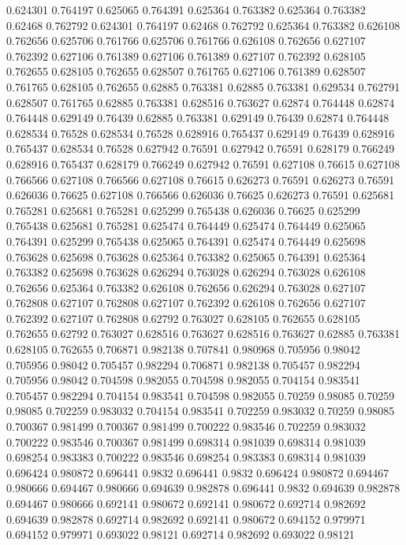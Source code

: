 0.624301 0.764197
0.625065 0.764391
0.625364 0.763382
0.625364 0.763382
0.62468 0.762792
0.624301 0.764197
0.62468 0.762792
0.625364 0.763382
0.626108 0.762656
0.625706 0.761766
0.625706 0.761766
0.626108 0.762656
0.627107 0.762392
0.627106 0.761389
0.627106 0.761389
0.627107 0.762392
0.628105 0.762655
0.628105 0.762655
0.628507 0.761765
0.627106 0.761389
0.628507 0.761765
0.628105 0.762655
0.62885 0.763381
0.62885 0.763381
0.629534 0.762791
0.628507 0.761765
0.62885 0.763381
0.628516 0.763627
0.62874 0.764448
0.62874 0.764448
0.629149 0.76439
0.62885 0.763381
0.629149 0.76439
0.62874 0.764448
0.628534 0.76528
0.628534 0.76528
0.628916 0.765437
0.629149 0.76439
0.628916 0.765437
0.628534 0.76528
0.627942 0.76591
0.627942 0.76591
0.628179 0.766249
0.628916 0.765437
0.628179 0.766249
0.627942 0.76591
0.627108 0.76615
0.627108 0.766566
0.627108 0.766566
0.627108 0.76615
0.626273 0.76591
0.626273 0.76591
0.626036 0.76625
0.627108 0.766566
0.626036 0.76625
0.626273 0.76591
0.625681 0.765281
0.625681 0.765281
0.625299 0.765438
0.626036 0.76625
0.625299 0.765438
0.625681 0.765281
0.625474 0.764449
0.625474 0.764449
0.625065 0.764391
0.625299 0.765438
0.625065 0.764391
0.625474 0.764449
0.625698 0.763628
0.625698 0.763628
0.625364 0.763382
0.625065 0.764391
0.625364 0.763382
0.625698 0.763628
0.626294 0.763028
0.626294 0.763028
0.626108 0.762656
0.625364 0.763382
0.626108 0.762656
0.626294 0.763028
0.627107 0.762808
0.627107 0.762808
0.627107 0.762392
0.626108 0.762656
0.627107 0.762392
0.627107 0.762808
0.62792 0.763027
0.628105 0.762655
0.628105 0.762655
0.62792 0.763027
0.628516 0.763627
0.628516 0.763627
0.62885 0.763381
0.628105 0.762655
0.706871 0.982138
0.707841 0.980968
0.705956 0.98042
0.705956 0.98042
0.705457 0.982294
0.706871 0.982138
0.705457 0.982294
0.705956 0.98042
0.704598 0.982055
0.704598 0.982055
0.704154 0.983541
0.705457 0.982294
0.704154 0.983541
0.704598 0.982055
0.70259 0.98085
0.70259 0.98085
0.702259 0.983032
0.704154 0.983541
0.702259 0.983032
0.70259 0.98085
0.700367 0.981499
0.700367 0.981499
0.700222 0.983546
0.702259 0.983032
0.700222 0.983546
0.700367 0.981499
0.698314 0.981039
0.698314 0.981039
0.698254 0.983383
0.700222 0.983546
0.698254 0.983383
0.698314 0.981039
0.696424 0.980872
0.696441 0.9832
0.696441 0.9832
0.696424 0.980872
0.694467 0.980666
0.694467 0.980666
0.694639 0.982878
0.696441 0.9832
0.694639 0.982878
0.694467 0.980666
0.692141 0.980672
0.692141 0.980672
0.692714 0.982692
0.694639 0.982878
0.692714 0.982692
0.692141 0.980672
0.694152 0.979971
0.694152 0.979971
0.693022 0.98121
0.692714 0.982692
0.693022 0.98121
